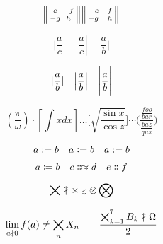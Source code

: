 \documentclass{article}
\newcommand{\horz}{\noindent\makebox[\linewidth]{\rule{\paperwidth}{0.4pt}}}
\begin{document}
\[
\begin{Vsmallmatrix} e & -f \\ -g & h \end{Vsmallmatrix}
\begin{Vsmallmatrix*}[r] e & -f \\ -g & h \end{Vsmallmatrix*}
\]

\horz

\[
\lvert \frac{a}{c} \rvert \quad \left\lvert \frac{a}{c} \right\rvert \quad \Bigg\lvert \frac{a}{b} \Bigg\rvert
\]

\DeclarePairedDelimiter\abs{\lvert}{\rvert}
\[
\abs{\frac{a}{b}} \quad \abs*{\frac{a}{b}} \quad \abs[\Bigg]{\frac{a}{b}}
\]

\horz

\[
\left( \frac{\pi}{\omega} \right) \cdot \left[ \int x dx \right] \ldots \lbrack \sqrt{\frac{\sin x}{\cos z}} \rbrack \cdots \lparen \frac{\frac{foo}{bar}}{\frac{baz}{qux}} \rparen
\]

\horz

\[
a := b \quad
a \vcentcolon= b \quad
a \ordinarycolon= b
\]

\[
a \coloneqq b \quad c \Colonapprox d \quad e \dblcolon f
\]

\[
\bigtimes \nuparrow \times \ndownarrow \otimes \bigotimes
\]

\[
\lim_{a\ndownarrow 0} f(a) \neq \bigtimes_n X_n \qquad
\frac{ \bigtimes_{k=1}^7 B_k \nuparrow \Omega }{2}
\]

\horz
\end{document}
